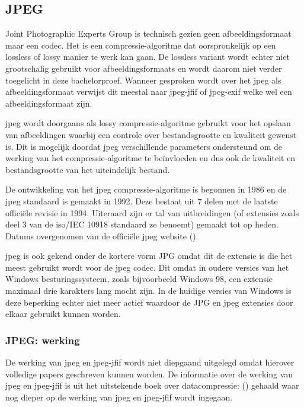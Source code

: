\subsection{JPEG}
\label{sec:afbeeldingscompressie-jpeg}

Joint Photographic Experts Group is technisch gezien geen \gls{afbeeldingsformaat} maar een \gls{codec}. Het is een \gls{compressie-algoritme} dat oorspronkelijk op een \gls{lossless} of \gls{lossy} manier te werk kan gaan. De \gls{lossless} variant wordt echter niet grootschalig gebruikt voor \glspl{afbeeldingsformaat} en wordt daarom niet verder toegelicht in deze bachelorproef. Wanneer gesproken wordt over het \gls{jpeg} als \gls{afbeeldingsformaat} verwijst dit meestal naar  \gls{jpeg-jfif} of \gls{jpeg-exif} welke wel een \gls{afbeeldingsformaat} zijn.

\gls{jpeg} wordt doorgaans als \gls{lossy} \gls{compressie-algoritme} gebruikt voor het opslaan van afbeeldingen waarbij een controle over bestandsgrootte en kwaliteit gewenst is. Dit is mogelijk doordat \gls{jpeg} verschillende parameters ondersteund om de werking van het \gls{compressie-algoritme} te beïnvloeden en dus ook de kwaliteit en bestandsgrootte van het uiteindelijk bestand.

De ontwikkeling van het \gls{jpeg} \gls{compressie-algoritme} is begonnen in 1986 en de \gls{jpeg} standaard is gemaakt in 1992. Deze bestaat uit 7 delen met de laatste officiële revisie in 1994. Uiteraard zijn er tal van uitbreidingen (of extensies zoals deel 3 van de \gls{iso}/IEC 10918 standaard ze benoemt) gemaakt tot op heden. Datums overgenomen van de officiële \gls{jpeg} website (\cite{jpegorg}). 

\gls{jpeg} is ook gekend onder de kortere vorm JPG omdat dit de extensie is die het meest gebruikt wordt voor de \gls{jpeg} \gls{codec}. Dit omdat in oudere versies van het Windows besturingssysteem, zoals bijvoorbeeld Windows 98, een \gls{extensie} maximaal drie karakters lang mocht zijn. In de huidige versies van Windows is deze beperking echter niet meer actief waardoor de JPG en \gls{jpeg} \glspl{extensie} door elkaar gebruikt kunnen worden.

\subsubsection{JPEG: werking}
\label{sec:afbeeldingscompressie-jpeg-werking}

De werking van \gls{jpeg} en \gls{jpeg-jfif} wordt niet diepgaand uitgelegd omdat hierover volledige papers geschreven kunnen worden. De informatie over de werking van  \gls{jpeg} en \gls{jpeg-jfif} is uit het uitstekende boek over \gls{datacompressie}:  (\cite{Salomon2006}) gehaald waar nog dieper op de werking van \gls{jpeg} en \gls{jpeg-jfif} wordt ingegaan.

